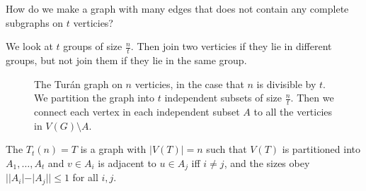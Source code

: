 How do we make a graph with many edges that does not contain any complete subgraphs on $t$ verticies?

We look at $t$ groups of size $\frac{n}{t}$. Then join two verticies if they lie in different groups, but not join them if they lie in the same group.


\begin{figure}
\begin{center}
\end{center}
\caption{The Tur\'an graph on $n$ verticies, in the case that $n$ is divisible by $t$. We partition the graph into $t$ independent subsets of size $\frac{n}{t}$. Then we connect each vertex in each independent subset $A$ to all the verticies in $V(G)\setminus A$.  \label{fig:turan_graph}}
\end{figure}


The  $T_t(n)=T$ is a graph with $|V(T)|=n$ such that $V(T)$ is  partitioned into $A_1,\dotsc,A_{t}$ and $v\in A_i$ is adjacent to $u\in A_j$ iff $i\neq j$, and the sizes obey $||A_i| - |A_j|| \leq 1$ for all $i,j$.

